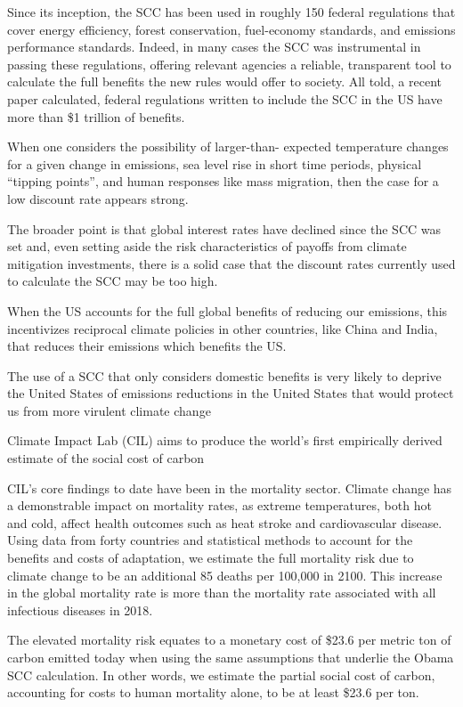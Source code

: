 \documentclass[
]{book}
\begin{document}
Since its inception, the SCC has been used in roughly 150 federal regulations that cover energy
efficiency, forest conservation, fuel-economy standards, and emissions performance standards.
Indeed, in many cases the SCC was instrumental in passing these regulations, offering relevant
agencies a reliable, transparent tool to calculate the full benefits the new rules would offer to
society. All told, a recent paper calculated, federal regulations written to include the SCC in the
US have more than \$1 trillion of benefits.

When one considers the possibility of larger-than-
expected temperature changes for a given change in emissions, sea level rise in short time
periods, physical ``tipping points'', and human responses like mass migration, then the case for a
low discount rate appears strong.

The broader point is that global
interest rates have declined since the SCC was set and, even setting aside the risk characteristics
of payoffs from climate mitigation investments, there is a solid case that the discount rates
currently used to calculate the SCC may be too high.

When the US accounts for the full global benefits of reducing
our emissions, this incentivizes reciprocal climate policies in other countries, like China and
India, that reduces their emissions which benefits the US.

The use of a SCC that only
considers domestic benefits is very likely to deprive the United States of emissions reductions in
the United States that would protect us from more virulent climate change

Climate Impact Lab (CIL) aims to produce the
world's first empirically derived estimate of the social cost of carbon

CIL's core findings to date have been in the mortality sector. Climate change has a demonstrable
impact on mortality rates, as extreme temperatures, both hot and cold, affect health outcomes
such as heat stroke and cardiovascular disease. Using data from forty countries and statistical
methods to account for the benefits and costs of adaptation, we estimate the full mortality risk
due to climate change to be an additional 85 deaths per 100,000 in 2100.
This increase in the global mortality rate is more than the mortality rate associated with
all infectious diseases in 2018.

The elevated mortality risk equates to a monetary cost of \$23.6
per metric ton of carbon emitted today when using the same assumptions that underlie the
Obama SCC calculation. In other words, we estimate the partial social cost of carbon,
accounting for costs to human mortality alone, to be at least \$23.6 per ton.
\end{document}
